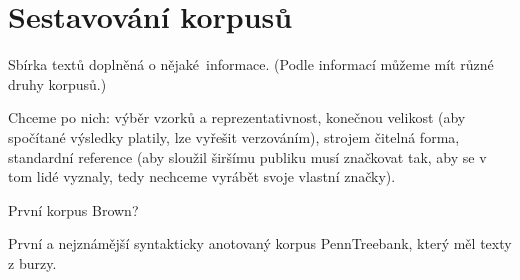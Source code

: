 \documentclass[12pt]{article}					%
\begin{document}
\section{Sestavování korpusů}
\begin{definice}[Korpus]
	Sbírka textů doplněná o nějaké informace. (Podle informací můžeme mít různé druhy korpusů.)

	Chceme po nich: výběr vzorků a reprezentativnost, konečnou velikost (aby spočítané výsledky platily, lze vyřešit verzováním), strojem čitelná forma, standardní reference (aby sloužil širšímu publiku musí značkovat tak, aby se v tom lidé vyznaly, tedy nechceme vyrábět svoje vlastní značky).

	\begin{prikladyin}
		První korpus Brown?

		První a nejznámější syntakticky anotovaný korpus PennTreebank, který měl texty z burzy.
	\end{prikladyin}
\end{definice}
\end{document}

